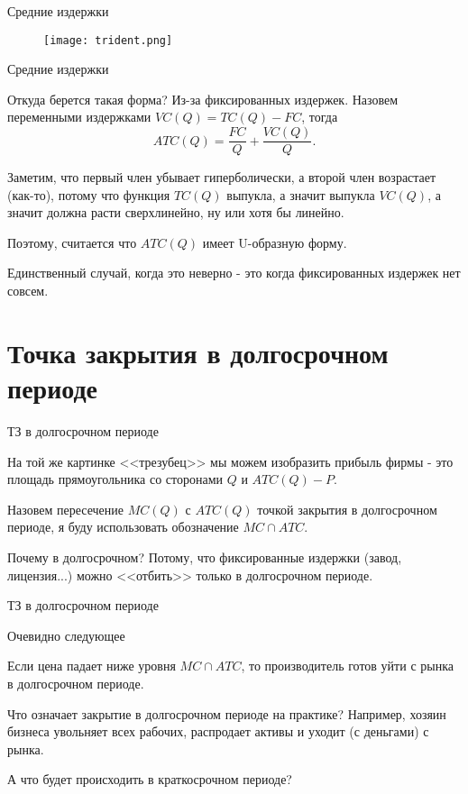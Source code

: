 \documentclass{beamer}
\begin{document}
\begin{frame}{Средние издержки}
\begin{figure}[hbt]
\centering
\texttt{[image: trident.png]}
\end{figure}
\end{frame}

\begin{frame}{Средние издержки}

Откуда берется такая форма? Из-за фиксированных издержек. Назовем переменными издержками $VC(Q) = TC(Q) - FC$, тогда
$$ ATC(Q) = \frac{FC}{Q} + \frac{VC(Q)}{Q}.$$

Заметим, что первый член убывает гиперболически, а второй член возрастает (как-то), потому что функция $TC(Q)$ выпукла, а значит выпукла $VC(Q)$, а значит должна расти сверхлинейно, ну или хотя бы линейно.

Поэтому, считается что $ATC(Q)$ имеет U-образную форму. 

Единственный случай, когда это неверно - это когда фиксированных издержек нет совсем.

\end{frame}

\section{Точка закрытия в долгосрочном периоде}

\begin{frame}{ТЗ в долгосрочном периоде}

На той же картинке <<трезубец>> мы можем изобразить прибыль фирмы - это площадь прямоугольника со сторонами $Q$ и $ATC(Q)-P$. 

\begin{definition}
Назовем пересечение $MC(Q)$ с $ATC(Q)$ \alert{точкой закрытия в долгосрочном периоде}, я буду использовать обозначение $MC \cap ATC$.
\end{definition}

Почему в долгосрочном? Потому, что фиксированные издержки (завод, лицензия...) можно <<отбить>> только в долгосрочном периоде. 

\end{frame}

\begin{frame}{ТЗ в долгосрочном периоде}

Очевидно следующее

\begin{lemma}
Если цена падает ниже уровня $MC \cap ATC$, то производитель готов уйти с рынка в долгосрочном периоде.
\end{lemma}

Что означает закрытие в долгосрочном периоде на практике? Например, хозяин бизнеса увольняет всех рабочих, распродает активы и уходит (с деньгами) с рынка.

А что будет происходить в краткосрочном периоде?

\end{frame}
\end{document}
